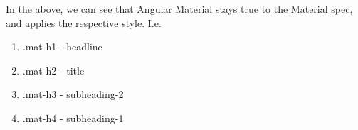 In the above, we can see that Angular Material stays true to the Material
spec, and applies the respective style. I.e. 
\begin{enumerate}
  \item .mat-h1 - headline
  \item .mat-h2 - title
  \item .mat-h3 - subheading-2
  \item .mat-h4 - subheading-1
\end{enumerate}

